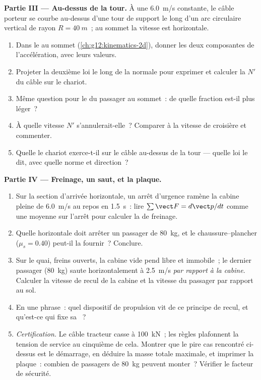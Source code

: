 \begin{problem}
\medskip
\noindent\textbf{Partie III --- Au-dessus de la tour.} À une
\qty{6.0}{m/s} constante, le câble porteur se courbe au-dessus d'une
tour de support le long d'un arc circulaire vertical de rayon
$R = \qty{40}{m}$~; au sommet la vitesse est horizontale.
\begin{enumerate}[resume]
  \item Dans le  au sommet
        (\cref{ch:g12:kinematics-2d}), donner les deux composantes de
        l'accélération, avec leurs valeurs.
  \item Projeter la deuxième loi le long de la normale pour exprimer et
        calculer la  $N'$ du câble sur le
        chariot.
  \item Même question pour le  du passager
        au sommet~: de quelle fraction est-il plus léger~?
  \item À quelle vitesse $N'$ s'annulerait-elle~? Comparer à la vitesse
        de croisière et commenter.
  \item Quelle  le chariot exerce-t-il sur le câble
        au-dessus de la tour --- quelle loi le dit, avec quelle norme et
        direction~?
\end{enumerate}

\medskip
\noindent\textbf{Partie IV --- Freinage, un saut, et la plaque.}
\begin{enumerate}[resume]
  \item Sur la section d'arrivée horizontale, un arrêt d'urgence ramène
        la cabine pleine de \qty{6.0}{m/s} au repos en \qty{1.5}{s}~: lire
        $\sum \vect F = d\vect p/dt$ comme une moyenne sur l'arrêt pour
        calculer la  de freinage.
  \item Quelle  horizontale doit arrêter un passager
        de \qty{80}{kg}, et le 
        chaussure--plancher ($\mu_s = 0.40$) peut-il la fournir~?
        Conclure.
  \item Sur le quai, freins ouverts, la cabine vide pend libre et
        immobile~; le dernier passager (\qty{80}{kg}) saute
        horizontalement à \qty{2.5}{m/s} \emph{par rapport à la cabine}.
        Calculer la vitesse de recul de la cabine et la vitesse du
        passager par rapport au sol.
  \item En une phrase~: quel dispositif de propulsion vit de ce principe
        de recul, et qu'est-ce qui fixe sa ~?
  \item \emph{Certification.} Le câble tracteur casse à \qty{100}{kN}~;
        les règles plafonnent la tension de service au
        cinquième de cela. Montrer que le pire cas rencontré ci-dessus
        est le démarrage, en déduire la masse totale maximale, et
        imprimer la plaque~: combien de passagers de \qty{80}{kg} peuvent
        monter~? Vérifier le facteur de sécurité.
\end{enumerate}
\end{problem}
